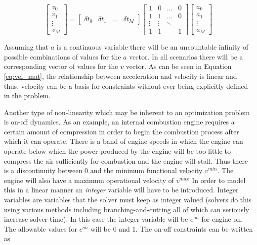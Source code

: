 \documentclass[12pt]{article}
\begin{document}
\begin{equation}
	\begin{bmatrix}
		v_0 \\ v_1 \\ \vdots \\ v_M
	\end{bmatrix}=
	\begin{bmatrix}
		\delta t_0 & \delta t_1 & \dots & \delta t_M
	\end{bmatrix}
	\begin{bmatrix}
		1 & 0 & \dots & 0\\
		1 & 1 & \dots & 0\\
		\vdots & \vdots &\ddots & \\
		1 & 1 & & 1
	\end{bmatrix}
	\begin{bmatrix}
		a_0 \\ a_1 \\ \vdots \\ a_M
	\end{bmatrix}
	\label{eq:vel_mat}
\end{equation}

Assuming that $a$ is a continuous variable there will be an uncountable infinity of possible combinations of values for the $a$ vector. In all scenarios there will be a corresponding vector of values for the $v$ vector. As can be seen in Equation \eqref{eq:vel_mat}, the relationship between acceleration and velocity is linear and thus, velocity can be a basis for constraints without ever being explicitly defined in the problem.

Another type of non-linearity which may be inherent to an optimization problem is on-off dynamics. As an example, an internal combustion engine requires a certain amount of compression in order to begin the combustion process after which it can operate. There is a band of engine speeds in which the engine can operate below which the power produced by the engine will be too little to compress the air sufficiently for combustion and the engine will stall. Thus there is a discontinuity between 0 and the minimum functional velocity $v^{min}$. The engine will also have a maximum operational velocity of $v^{max}$ In order to model this in a linear manner an \textit{integer} variable will have to be introduced. Integer variables are variables that the solver must keep as integer valued (solvers do this using various methods including branching-and-cutting all of which can seriously increase solver-time). In this case the integer variable will be $e^{on}$ for engine on.
The allowable values for $e^{on}$ will be 0 and 1. The on-off constraints can be written as
\end{document}
